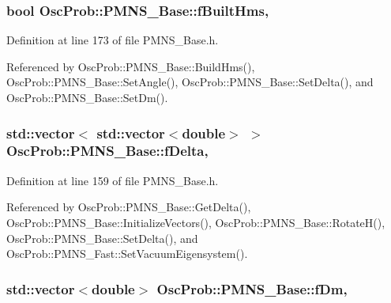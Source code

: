 \subsubsection[{\texorpdfstring{f\+Built\+Hms}{fBuiltHms}}]{\setlength{\rightskip}{0pt plus 5cm}bool Osc\+Prob\+::\+P\+M\+N\+S\+\_\+\+Base\+::f\+Built\+Hms\hspace{0.3cm}{\ttfamily [protected]}, {\ttfamily [inherited]}}\hypertarget{classOscProb_1_1PMNS__Base_a9ac3cadeac8db1b90f3152f476244780}{}\label{classOscProb_1_1PMNS__Base_a9ac3cadeac8db1b90f3152f476244780}


Definition at line 173 of file P\+M\+N\+S\+\_\+\+Base.\+h.



Referenced by Osc\+Prob\+::\+P\+M\+N\+S\+\_\+\+Base\+::\+Build\+Hms(), Osc\+Prob\+::\+P\+M\+N\+S\+\_\+\+Base\+::\+Set\+Angle(), Osc\+Prob\+::\+P\+M\+N\+S\+\_\+\+Base\+::\+Set\+Delta(), and Osc\+Prob\+::\+P\+M\+N\+S\+\_\+\+Base\+::\+Set\+Dm().

\subsubsection[{\texorpdfstring{f\+Delta}{fDelta}}]{\setlength{\rightskip}{0pt plus 5cm}std\+::vector$<$ std\+::vector$<$double$>$ $>$ Osc\+Prob\+::\+P\+M\+N\+S\+\_\+\+Base\+::f\+Delta\hspace{0.3cm}{\ttfamily [protected]}, {\ttfamily [inherited]}}\hypertarget{classOscProb_1_1PMNS__Base_ab2a5fa40e689b221c8a7d2c17213810d}{}\label{classOscProb_1_1PMNS__Base_ab2a5fa40e689b221c8a7d2c17213810d}


Definition at line 159 of file P\+M\+N\+S\+\_\+\+Base.\+h.



Referenced by Osc\+Prob\+::\+P\+M\+N\+S\+\_\+\+Base\+::\+Get\+Delta(), Osc\+Prob\+::\+P\+M\+N\+S\+\_\+\+Base\+::\+Initialize\+Vectors(), Osc\+Prob\+::\+P\+M\+N\+S\+\_\+\+Base\+::\+Rotate\+H(), Osc\+Prob\+::\+P\+M\+N\+S\+\_\+\+Base\+::\+Set\+Delta(), and Osc\+Prob\+::\+P\+M\+N\+S\+\_\+\+Fast\+::\+Set\+Vacuum\+Eigensystem().

\subsubsection[{\texorpdfstring{f\+Dm}{fDm}}]{\setlength{\rightskip}{0pt plus 5cm}std\+::vector$<$double$>$ Osc\+Prob\+::\+P\+M\+N\+S\+\_\+\+Base\+::f\+Dm\hspace{0.3cm}{\ttfamily [protected]}, {\ttfamily [inherited]}}\hypertarget{classOscProb_1_1PMNS__Base_a406a31c3b5d620e5a0cace5b411f9f70}{}\label{classOscProb_1_1PMNS__Base_a406a31c3b5d620e5a0cace5b411f9f70}



